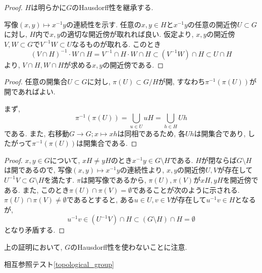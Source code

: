 \begin{proof}
    $H$は明らかに$G$のHausdorff性を継承する.

    写像$(x,y)\mapsto x^{-1}y$の連続性を示す.
    任意の$x, y\in H$と$x^{-1}y$の任意の開近傍$U\subset G$に対し,
    $H$内で$x, y$の適切な開近傍が取れれば良い.
    仮定より, $x, y$の開近傍$V, W\subset G$で$V^{-1}W\subset U$なるものが取れる.
    このとき
    \[(V\cap H)^{-1} \cdot W\cap H
    = V^{-1}\cap H \cdot W\cap H
    \subset (V^{-1}W) \cap H \subset U\cap H
    \]
    より, $V\cap H , W\cap H$が求める$x, y$の開近傍である.
\end{proof}

\begin{proposition}
    
\end{proposition}

\begin{proof}
    任意の開集合$U\subset G$に対し, $\pi(U)\subset G/H$が開,
    すなわち$\pi^{-1}(\pi(U))$が開であればよい.

    まず,
    \[\pi^{-1}(\pi(U)) = \bigcup_{u\in U}uH = \bigcup_{h\in H}Uh
    \]
    である.
    また, 右移動$G\to G ;x\mapsto xh$は同相であるため,
    各$Uh$は開集合であり,
    したがって$\pi^{-1}(\pi(U))$は開集合である.
\end{proof}

\begin{proposition}
    
\end{proposition}

\begin{proof}
    $x, y\in G$について, $xH \neq yH$のとき$x^{-1}y\in G\setminus H$である.
    $H$が閉ならば$G\setminus H$は開であるので,
    写像$(x,y)\mapsto x^{-1}y$の連続性より,
    $x, y$の開近傍$U, V$が存在して$U^{-1}V\subset G\setminus H$を満たす.
    $\pi$は開写像であるから, $\pi(U), \pi(V)$が$xH, yH$を開近傍である.
    また, このとき$\pi(U)\cap \pi(V)= \emptyset$であることが次のように示される.
    $\pi(U)\cap \pi(V)\neq \emptyset$であるとすると,
    ある$u\in U, v\in V$が存在して$u^{-1}v\in H$となるが,
    \[u^{-1}v \in (U^{-1}V)\cap H \subset (G\setminus H)\cap H = \emptyset
    \]
    となり矛盾する.
\end{proof}
上の証明において, $G$のHausdorff性を使わないことに注意.


相互参照テスト\ref{topological_group}
